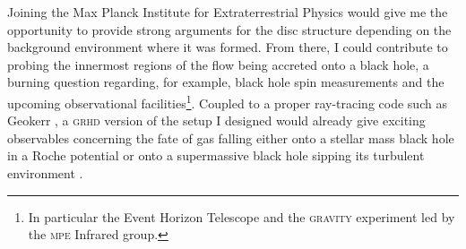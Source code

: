 \documentclass[a4paper,12pt,onecolumn]{article}
\begin{document}
\indent Joining the Max Planck Institute for Extraterrestrial Physics would give me the opportunity to provide strong arguments for the disc structure depending on the background environment where it was formed. From there, I could contribute to probing the innermost regions of the flow being accreted onto a black hole, a burning question regarding, for example, black hole spin measurements \cite{Penna:2010tp} and the upcoming observational facilities\footnote{In particular the Event Horizon Telescope \cite{Doeleman2009} and the \textsc{gravity} experiment \cite{Eisenhauer2011} led by the \textsc{mpe} Infrared group.}. Coupled to a proper ray-tracing code such as Geokerr \cite{Dexter2009}, a \textsc{grhd} version of the setup I designed would already give exciting observables concerning the fate of gas falling either onto a stellar mass black hole in a Roche potential or onto a supermassive black hole sipping its turbulent environment \cite{Ricarte2014}. 

\end{document}
